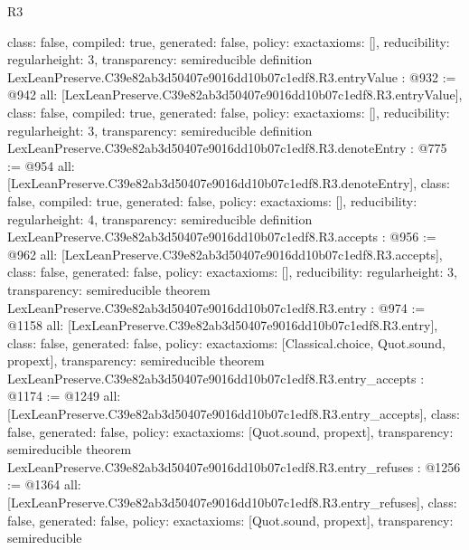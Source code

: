 \begin{lexlean}{R3}
\begin{coremodule}
{  class: false,
  compiled: true,
  generated: false,
  policy: exact{axioms: []},
  reducibility: regular{height: 3},
  transparency: semireducible
}
definition LexLeanPreserve.C39e82ab3d50407e9016dd10b07c1edf8.R3.entryValue : @932 := @942 {
  all: [LexLeanPreserve.C39e82ab3d50407e9016dd10b07c1edf8.R3.entryValue],
  class: false,
  compiled: true,
  generated: false,
  policy: exact{axioms: []},
  reducibility: regular{height: 3},
  transparency: semireducible
}
definition LexLeanPreserve.C39e82ab3d50407e9016dd10b07c1edf8.R3.denoteEntry : @775 := @954 {
  all: [LexLeanPreserve.C39e82ab3d50407e9016dd10b07c1edf8.R3.denoteEntry],
  class: false,
  compiled: true,
  generated: false,
  policy: exact{axioms: []},
  reducibility: regular{height: 4},
  transparency: semireducible
}
definition LexLeanPreserve.C39e82ab3d50407e9016dd10b07c1edf8.R3.accepts : @956 := @962 {
  all: [LexLeanPreserve.C39e82ab3d50407e9016dd10b07c1edf8.R3.accepts],
  class: false,
  generated: false,
  policy: exact{axioms: []},
  reducibility: regular{height: 3},
  transparency: semireducible
}
theorem LexLeanPreserve.C39e82ab3d50407e9016dd10b07c1edf8.R3.entry : @974 := @1158 {
  all: [LexLeanPreserve.C39e82ab3d50407e9016dd10b07c1edf8.R3.entry],
  class: false,
  generated: false,
  policy: exact{axioms: [Classical.choice, Quot.sound, propext]},
  transparency: semireducible
}
theorem LexLeanPreserve.C39e82ab3d50407e9016dd10b07c1edf8.R3.entry_accepts : @1174 := @1249 {
  all: [LexLeanPreserve.C39e82ab3d50407e9016dd10b07c1edf8.R3.entry_accepts],
  class: false,
  generated: false,
  policy: exact{axioms: [Quot.sound, propext]},
  transparency: semireducible
}
theorem LexLeanPreserve.C39e82ab3d50407e9016dd10b07c1edf8.R3.entry_refuses : @1256 := @1364 {
  all: [LexLeanPreserve.C39e82ab3d50407e9016dd10b07c1edf8.R3.entry_refuses],
  class: false,
  generated: false,
  policy: exact{axioms: [Quot.sound, propext]},
  transparency: semireducible
}


\end{coremodule}
\end{lexlean}
